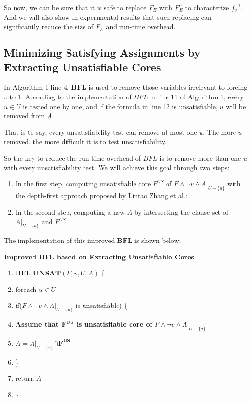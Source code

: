 \documentclass[journal]{IEEEtran}
\begin{document}
So now,
we can be sure that it is safe to replace $F_E$ with $F_E^v$ to characterize $f^{-1}_v$.
And we will also show in experimental results that such replacing can significantly reduce the size of $F_E$  and run-time overhead.

\subsection{Minimizing Satisfying Assignments by Extracting Unsatisfiable Cores}\label{subsec_bfl}

In Algorithm 1 line 4,
$\boldsymbol{BFL}$ \cite{MINASS} is used to remove those variables irrelevant to forcing $v$ to 1.
According to the implementation of $BFL$ in line 11 of Algorithm 1,
every $u\in U$ is tested one by one,
and if the formula in line 12 is unsatisfiable,
$u$ will be removed from $A$.

That is to say,
every unsatisfiability test can remove at most one $u$.
The more $u$ removed,
the more difficult it is to test unsatisfiability.

So the key to reduce the run-time overhead of $BFL$ is to remove more than one $u$ with every unsatisfiability test.
We will achieve this goal through two steps:
\begin{enumerate}
\item In the first step,
computing unsatisfiable core $F^{US}$ of $F\wedge \neg v\wedge A|_{U -\{u\}}$ with the depth-first approach proposed by Lintao Zhang et al.\cite{VALIDSAT}:
\item In the second step,
computing a new $A$ by intersecting the clause set of $A|_{U-\{u\}}$ and $F^{US}$
\end{enumerate}

The implementation of this improved $\boldsymbol{BFL}$ is shown below:
\vspace{0.2cm}
\begin{algo}
\textbf{Improved $\boldsymbol{BFL}$ based on Extracting Unsatisfiable Cores}
\begin{enumerate}
\item $\boldsymbol{BFL\_UNSAT}(F,v,U,A)$ \{
\item \hspace{0.3cm} foreach $u\in U$
\item \hspace{0.6cm}  if($F\wedge \neg v\wedge A|_{U -\{u\}}$ is unsatisfiable) \{
\item \hspace{0.9cm}     \textbf{Assume that $\boldsymbol{F^{US}}$ is unsatisfiable core of $F\wedge \neg v\wedge A|_{U -\{u\}}$}
\item \hspace{0.9cm}     $A= A|_{U -\{u\}}\boldsymbol{\cap F^{US}}$
\item \hspace{0.6cm} \}
\item \hspace{0.3cm} return $A$
\item \}
\end{enumerate}
\end{algo}
\end{document}
